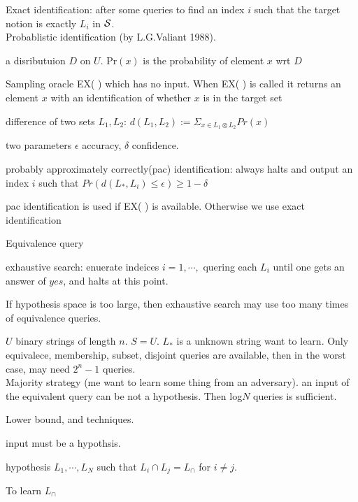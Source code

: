 \documentclass[12pt]{article}
\begin{document}
Exact identification: after some queries to find an index $i$ such that the target notion is exactly $L_i$ in ${\cal S}$.\\


Probablistic identification (by L.G.Valiant 1988).

a disributuion $D$ on $U$. Pr$(x)$ is the probability of element $x$ wrt $D$

Sampling oracle EX( ) which has no input. When EX( ) is called it returns an element $x$ with an identification of whether $x$ is in the target set

difference of two sets $L_1, L_2$: $d(L_1, L_2):=\Sigma_{x\in L_1\otimes L_2} Pr(x)$


two parameters $\epsilon$ accuracy, $\delta$ confidence.

probably approximately correctly(pac) identification: always halts and output an index $i$ such that 
$Pr(d(L_*, L_i)\leq \epsilon)\geq 1-\delta$

pac identification is used if EX( ) is available. Otherwise we use exact identification




Equivalence query

exhaustive search: enuerate indeices $i=1,\cdots,$ quering each $L_i$ until one gets an answer of $yes$, and halts at this point.

If hypothesis space is too large, then exhaustive search may use too many times of equivalence queries. 


$U$ binary strings of length $n$. $S=U$. $L_*$ is a unknown string want to learn.
Only equivalece, membership, subset, disjoint queries are available, then in the worst case, may need $2^{n}-1$ queries.
\\

Majority strategy (me want to learn some thing from an adversary). an input of the equivalent query can be not a hypothesis. 
Then log$N$ queries is sufficient. 

Lower bound, and techniques.

input must be a hypothsis.



hypothesis $L_1, \cdots, L_N$ such that $L_i\cap L_j=L_{\cap}$ for $i\not=j$. 

To learn $L_{\cap}$ 
\end{document}
